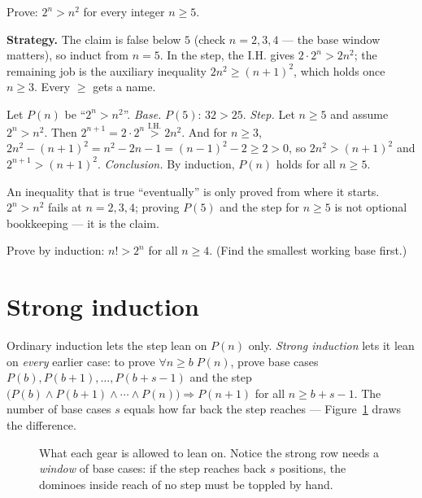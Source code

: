 \begin{example}\label{ex:2nvsn2}
Prove: $2^n > n^2$ for every integer $n \ge 5$.
\par\smallskip
\textbf{Strategy.} The claim is false below $5$ (check $n=2,3,4$ --- the base
window matters), so induct from $n=5$. In the step, the I.H. gives $2 \cdot
2^n > 2n^2$; the remaining job is the auxiliary inequality $2n^2 \ge (n+1)^2$,
which holds once $n \ge 3$. Every $\ge$ gets a name.
\par\smallskip
\begin{solution}
Let $P(n)$ be ``$2^n > n^2$''. \emph{Base.} $P(5)$: $32 > 25$. \emph{Step.}
Let $n \ge 5$ and assume $2^n > n^2$. Then
$2^{n+1} = 2 \cdot 2^n \overset{\text{I.H.}}{>} 2n^2$. And for $n \ge 3$,
$2n^2 - (n+1)^2 = n^2 - 2n - 1 = (n-1)^2 - 2 \ge 2 > 0$, so $2n^2 > (n+1)^2$
and $2^{n+1} > (n+1)^2$. \emph{Conclusion.} By induction, $P(n)$ holds for
all $n \ge 5$.
\end{solution}
\end{example}

\begin{tripwire}
An inequality that is true ``eventually'' is only proved from where it starts.
$2^n > n^2$ fails at $n=2,3,4$; proving $P(5)$ and the step for $n \ge 5$ is
not optional bookkeeping --- it is the claim.
\end{tripwire}

\begin{exercise}[medium]\label{exr:factorial}
Prove by induction: $n! > 2^n$ for all $n \ge 4$. (Find the smallest working
base first.)
\end{exercise}

\section{Strong induction}\label{sec:strong}

Ordinary induction lets the step lean on $P(n)$ only. \emph{Strong induction}
lets it lean on \emph{every} earlier case:
to prove $\forall n \ge b\;P(n)$, prove base cases
$P(b), P(b{+}1), \dots, P(b{+}s{-}1)$ and the step
$\bigl(P(b) \land P(b{+}1) \land \cdots \land P(n)\bigr) \Rightarrow P(n+1)$
for all $n \ge b{+}s{-}1$. The number of base cases $s$ equals how far back the
step reaches --- Figure~\ref{fig:reachback} draws the difference.

\begin{figure}[ht]\centering

\caption{What each gear is allowed to lean on. Notice the strong row needs a
\emph{window} of base cases: if the step reaches back $s$ positions, the
dominoes inside reach of no step must be toppled by hand.}
\label{fig:reachback}
\end{figure}

